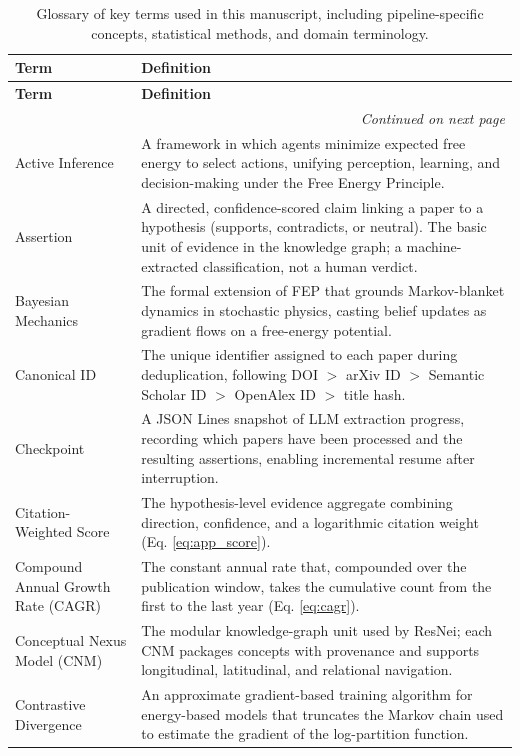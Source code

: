 \documentclass[
  english,
]{article}
\begin{document}
\begin{longtable}{p{4cm}p{11cm}}
\caption{Glossary of key terms used in this manuscript, including pipeline-specific concepts, statistical methods, and domain terminology.}
\label{tab:glossary} \\
\toprule
\textbf{Term} & \textbf{Definition} \\
\midrule
\endfirsthead
\toprule
\textbf{Term} & \textbf{Definition} \\
\midrule
\endhead
\midrule
\multicolumn{2}{r}{\textit{Continued on next page}} \\
\endfoot
\bottomrule
\endlastfoot
Active Inference & A framework in which agents minimize expected free energy to select actions, unifying perception, learning, and decision-making under the Free Energy Principle. \\
Assertion & A directed, confidence-scored claim linking a paper to a hypothesis (supports, contradicts, or neutral). The basic unit of evidence in the knowledge graph; a machine-extracted classification, not a human verdict. \\
Bayesian Mechanics & The formal extension of FEP that grounds Markov-blanket dynamics in stochastic physics, casting belief updates as gradient flows on a free-energy potential. \\
Canonical ID & The unique identifier assigned to each paper during deduplication, following DOI $>$ arXiv ID $>$ Semantic Scholar ID $>$ OpenAlex ID $>$ title hash. \\
Checkpoint & A JSON Lines snapshot of LLM extraction progress, recording which papers have been processed and the resulting assertions, enabling incremental resume after interruption. \\
Citation-Weighted Score & The hypothesis-level evidence aggregate combining direction, confidence, and a logarithmic citation weight (Eq. \ref{eq:app_score}). \\
Compound Annual Growth Rate (CAGR) & The constant annual rate that, compounded over the publication window, takes the cumulative count from the first to the last year (Eq. \ref{eq:cagr}). \\
Conceptual Nexus Model (CNM) & The modular knowledge-graph unit used by ResNei; each CNM packages concepts with provenance and supports longitudinal, latitudinal, and relational navigation. \\
Contrastive Divergence & An approximate gradient-based training algorithm for energy-based models \citep{hinton2002training} that truncates the Markov chain used to estimate the gradient of the log-partition function. \\

\end{longtable}
\end{document}
